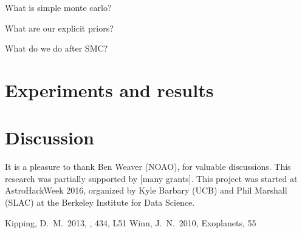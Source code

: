 \documentclass[12pt, preprint]{aastex}
\begin{document}
What is simple monte carlo?

What are our explicit priors?

What do we do after SMC?

\section{Experiments and results}

\section{Discussion}

\acknowledgements
It is a pleasure to thank
  Ben Weaver (NOAO),
for valuable discussions.
This research was partially supported by [many grants].
This project was started at AstroHackWeek 2016, organized by Kyle
Barbary (UCB) and Phil Marshall (SLAC) at the Berkeley Institute for
Data Science.

\begin{thebibliography}{99}\raggedright
{}
  Kipping, D.~M.\ 2013, \mnras, 434, L51
  Winn, J.~N.\ 2010, Exoplanets, 55 
\end{thebibliography}
\end{document}
